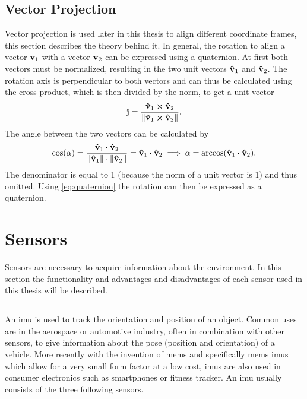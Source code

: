 \subsection{Vector Projection}
\label{subsec:vector_projection}
Vector projection is used later in this thesis to align different coordinate frames, this section describes the theory behind it.
In general, the rotation to align a vector $\vb{v}_1$ with a vector $\vb{v}_2$ can be expressed using a quaternion.
At first both vectors must be normalized, resulting in the two unit vectors $\vu{v}_1$ and $\vu{v}_2$.
The rotation axis is perpendicular to both vectors and can thus be calculated using the cross product, which is then divided by the norm, to get a unit vector
\begin{equation}
    \vb{j} = \frac{\vu{v}_1 \cp \vu{v}_2}{\norm{\vu{v}_1 \cp \vu{v}_2}}.
\end{equation}
The angle between the two vectors can be calculated by
\begin{equation}
    \cos(\alpha) = \frac{\vu{v}_1 \vdot \vu{v}_2}{\norm{\vu{v}_1} \cdot \norm{\vu{v}_2}}
    = \vu{v}_1 \vdot \vu{v}_2 \implies
    \alpha = \arccos(\vu{v}_1 \vdot \vu{v}_2).
\end{equation}
The denominator is equal to 1 (because the norm of a unit vector is 1) and thus omitted.
Using \cref{eq:quaternion} the rotation can then be expressed as a quaternion.



\section{Sensors}
\label{sec:sensors}
Sensors are necessary to acquire information about the environment.
In this section the functionality and advantages and disadvantages of each sensor used in this thesis will be described.

\subsection{}
An \gls{imu} is used to track the orientation and position of an object.
Common uses are in the aerospace or automotive industry, often in combination with other sensors, to give information about the pose (position and orientation) of a vehicle.
More recently with the invention of \gls{mems} and specifically \gls{mems} \glspl{imu} which allow for a very small form factor at a low cost, \glspl{imu} are also used in consumer electronics such as smartphones or fitness tracker.
An \gls{imu} usually consists of the three following sensors.

